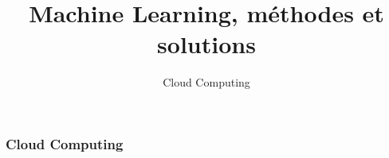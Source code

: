 \documentclass{formation}
\title{Machine Learning, méthodes et solutions}
\subtitle{Cloud Computing}
\begin{document}
\maketitle

\begin{frame}
  \frametitle{Cloud Computing}
  \begin{minipage}[l]{0.49\linewidth}
    \small{$\;$} \\
    \small{$\;$} \\
  \end{minipage}\hfill
  \begin{minipage}[l]{0.49\linewidth}
  \end{minipage}\hfill
\end{frame}
\end{document}
